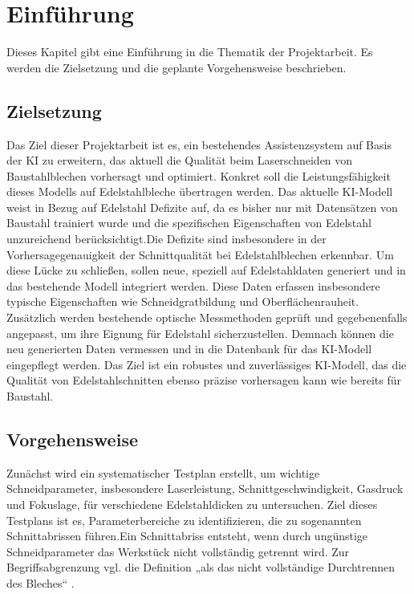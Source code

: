 \chapter{Einführung}

Dieses Kapitel gibt eine Einführung in die Thematik der Projektarbeit. Es werden die Zielsetzung und die geplante Vorgehensweise beschrieben. 

\section{Zielsetzung}Das Ziel dieser Projektarbeit ist es, ein bestehendes Assistenzsystem auf Basis der \ac{KI} zu erweitern, das aktuell die Qualität beim Laserschneiden von Baustahlblechen vorhersagt und optimiert. Konkret soll die Leistungsfähigkeit dieses Modells auf Edelstahlbleche übertragen werden. Das aktuelle \ac{KI}-Modell weist in Bezug auf Edelstahl Defizite auf, da es bisher nur mit Datensätzen von Baustahl trainiert wurde und die spezifischen Eigenschaften von Edelstahl unzureichend berücksichtigt.Die Defizite sind insbesondere in der Vorhersagegenauigkeit der Schnittqualität bei Edelstahlblechen erkennbar.
Um diese Lücke zu schließen, sollen neue, speziell auf Edelstahldaten generiert und in das bestehende Modell integriert werden. Diese Daten erfassen insbesondere typische Eigenschaften wie Schneidgratbildung und Oberflächenrauheit. Zusätzlich werden bestehende optische Messmethoden geprüft und gegebenenfalls angepasst, um ihre Eignung für Edelstahl sicherzustellen. Demnach können die neu generierten Daten vermessen und in die Datenbank für das \ac{KI}-Modell eingepflegt werden. Das Ziel ist ein robustes und zuverlässiges \ac{KI}-Modell, das die Qualität von Edelstahlschnitten ebenso präzise vorhersagen kann wie bereits für Baustahl.

\section{Vorgehensweise}
Zunächst wird ein systematischer Testplan erstellt, um wichtige Schneidparameter, insbesondere Laserleistung, Schnittgeschwindigkeit, Gasdruck und Fokuslage, für verschiedene Edelstahldicken zu untersuchen. Ziel dieses Testplans ist es, Parameterbereiche zu identifizieren, die zu sogenannten Schnittabrissen führen.Ein Schnittabriss entsteht, wenn durch ungünstige Schneidparameter das Werkstück nicht vollständig getrennt wird.
Zur Begriffsabgrenzung vgl. die Definition „als das nicht vollständige Durchtrennen des Bleches“ \cite{Schindhelm2014}.

